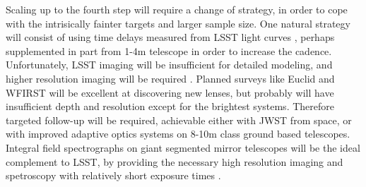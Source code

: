 Scaling up to the fourth step will require a change of strategy, in
order to cope with the intrisically fainter targets and larger sample
size. One natural strategy will consist of using time delays measured
from LSST light curves \citep{LiaoEtal2015}, perhaps supplemented in
part from 1-4m telescope in order to increase the
cadence. Unfortunately, LSST imaging will be insufficient for detailed
modeling, and higher resolution imaging will be required
\citep{Men++15}.
Planned surveys like Euclid and WFIRST will be excellent at
discovering new lenses, but probably will have insufficient depth and
resolution except for the brightest systems. Therefore targeted
follow-up will be required, achievable either with JWST from space, or
with improved adaptive optics systems on 8-10m class ground based
telescopes. Integral field spectrographs on giant segmented mirror
telescopes will be the ideal complement to LSST, by providing the
necessary high resolution imaging and spetroscopy with relatively
short exposure times
\citep[e.g.][]{Ski++15}.

